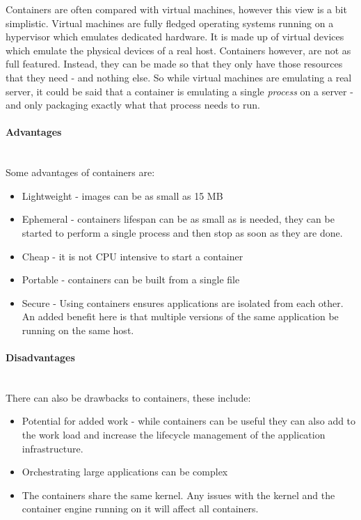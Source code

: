 \documentclass{article}
\begin{document}
Containers are often compared with virtual machines, however this view is a bit simplistic. Virtual machines are fully fledged operating systems running on a hypervisor which emulates dedicated hardware. It is made up of virtual devices which emulate the physical devices of a real host. Containers however, are not as full featured. Instead, they can be made so that they only have those resources that they need - and nothing else. So while virtual machines are emulating a real server, it could be said that a container is emulating a single \textit{process} on a server - and only packaging exactly what that process needs to run.

\paragraph{Advantages}\mbox{}\\
Some advantages of containers are:

\begin{itemize}
  \item Lightweight - images can be as small as 15 MB
  \item Ephemeral - containers lifespan can be as small as is needed, they can be started to perform a single process and then stop as soon as they are done. 
  \item Cheap - it is not CPU intensive to start a container
  \item Portable - containers can be built from a single file
  \item Secure - Using containers ensures applications are isolated from each other. An added benefit here is that multiple versions of the same application be running on the same host.
\end{itemize}

\paragraph{Disadvantages}\mbox{}\\

There can also be drawbacks to containers, these include:

\begin{itemize}
  \item Potential for added work - while containers can be useful they can also add to the work load and increase the lifecycle management of the application infrastructure.
  \item Orchestrating large applications can be complex
  \item The containers share the same kernel. Any issues with the kernel and the container engine running on it will affect all containers.
\end{itemize}
\end{document}
